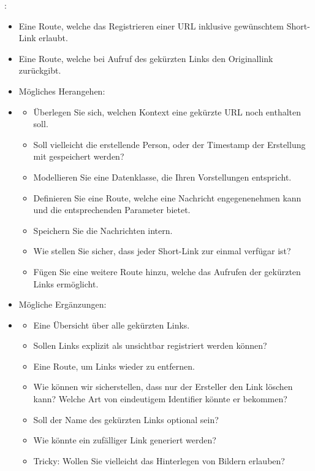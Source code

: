 \documentclass{ubo_tex_uebungszettel/uebungszettel}
\theoremstyle{definition}
\begin{document}
        \medskip
        :
        \begin{itemize}
            \item Eine Route, welche das Registrieren einer URL inklusive gewünschtem Short-Link erlaubt.
            \item Eine Route, welche bei Aufruf des gekürzten Links den Originallink zurückgibt.
            \item[] Mögliches Herangehen:
            \item[] \begin{itemize}
                \item Überlegen Sie sich, welchen Kontext eine gekürzte URL noch enthalten soll.
                \item[] Soll vielleicht die erstellende Person, oder der Timestamp der Erstellung mit gespeichert werden? 
                \item Modellieren Sie eine Datenklasse, die Ihren Vorstellungen entspricht.
                \item Definieren Sie eine Route, welche eine Nachricht engegenenehmen kann und die entsprechenden Parameter bietet.
                \item Speichern Sie die Nachrichten intern.
                \item[] Wie stellen Sie sicher, dass jeder Short-Link zur einmal verfügar ist?
                \item Fügen Sie eine weitere Route hinzu, welche das Aufrufen der gekürzten Links ermöglicht.
            \end{itemize}
            \item Mögliche Ergänzungen:
            \item[] \begin{itemize}
                \item Eine Übersicht über alle gekürzten Links.
                \item[] Sollen Links explizit als unsichtbar registriert werden können?
                \item Eine Route, um Links wieder zu entfernen.
                \item[] Wie können wir sicherstellen, dass nur der Ersteller den Link löschen kann? Welche Art von eindeutigem Identifier könnte er bekommen? 
                \item Soll der Name des gekürzten Links optional sein?
                \item[] Wie könnte ein zufälliger Link generiert werden?
                \item Tricky: Wollen Sie vielleicht das Hinterlegen von Bildern erlauben?
            \end{itemize}
        \end{itemize}
\end{document}

